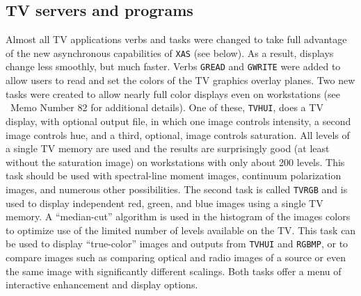\subsection{TV servers and programs}

Almost all TV applications verbs and tasks were changed to take
full advantage of the new asynchronous capabilities of {\tt XAS} (see
below).  As a result, displays change less smoothly, but much faster.
Verbs {\tt GREAD} and {\tt GWRITE} were added to allow users to read
and set the colors of the TV graphics overlay planes.  Two new tasks
were created to allow nearly full color displays even on workstations
(see \AIPS\ Memo Number 82 for additional details).  One of these,
{\tt TVHUI}, does a TV display, with optional output file, in which
one image controls intensity, a second image controls hue, and a
third, optional, image controls saturation.  All levels of a single TV
memory are used and the results are surprisingly good (at least
without the saturation image) on workstations with only about 200
levels.  This task should be used with spectral-line moment images,
continuum polarization images, and numerous other possibilities.  The
second task is called {\tt TVRGB} and is used to display independent
red, green, and blue images using a single TV memory.  A
``median-cut'' algorithm is used in the histogram of the images colors
to optimize use of the limited number of levels available on the TV.
This task can be used to display ``true-color'' images and outputs
from {\tt TVHUI} and {\tt RGBMP}, or to compare images such as
comparing optical and radio images of a source or even the same image
with significantly different scalings.  Both tasks offer a menu of
interactive enhancement and display options.


